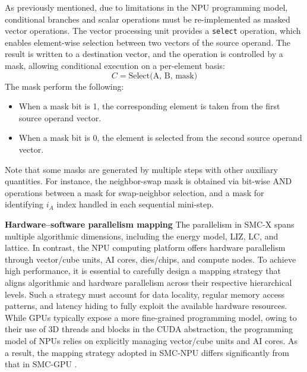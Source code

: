 \documentclass{article}
\begin{document}
As previously mentioned, due to limitations in the NPU programming model, conditional branches and scalar operations must be re-implemented as masked vector operations. The vector processing unit provides a \texttt{select} operation, which enables element-wise selection between two vectors of the source operand. The result is written to a destination vector, and the operation is controlled by a mask, allowing conditional execution on a per-element basis:
\begin{equation}
    C = \text{Select(A, B, mask)}
\end{equation}
The mask perform the following:
\begin{itemize}
    \item When a mask bit is 1, the corresponding element is taken from the first source operand vector.
    \item When a mask bit is 0, the element is selected from the second source operand vector.
\end{itemize}
Note that some masks are generated by multiple steps with other auxiliary quantities. For instance, the neighbor-swap mask is obtained via bit-wise AND operations between a mask for swap-neighbor selection, and a mask for identifying $i_A$ index handled in each sequential mini-step.

\textbf{Hardware--software parallelism mapping}
The parallelism in SMC-X spans multiple algorithmic dimensions, including the energy model, LIZ, LC, and lattice. In contrast, the NPU computing platform offers hardware parallelism through vector/cube units, AI cores, dies/chips, and compute nodes. 
To achieve high performance, it is essential to carefully design a mapping strategy that aligns algorithmic and hardware parallelism across their respective hierarchical levels. Such a strategy must account for data locality, regular memory access patterns, and latency hiding to fully exploit the available hardware resources. While GPUs typically expose a more fine-grained programming model, owing to their use of 3D threads and blocks in the CUDA abstraction, the programming model of NPUs relies on explicitly managing vector/cube units and AI cores. As a result, the mapping strategy adopted in SMC-NPU differs significantly from that in SMC-GPU \cite{LiuNPJ2025}.
\end{document}
